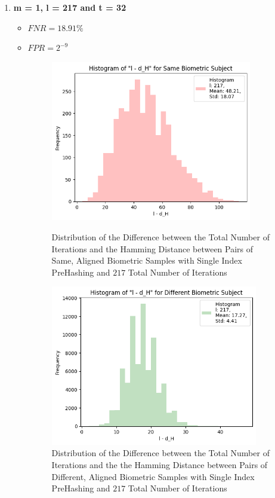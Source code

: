 \begin{enumerate}
    \item \textbf{m = 1, l = 217 and t = 32}
        \begin{itemize}
            \item $FNR = 18.91\%$
            \item $FPR = 2^{-9}$

            \begin{figure}[H]
                \centering
                \begin{minipage}[b]{0.48\linewidth}
                    \centering
                    \includegraphics[width=\linewidth,height=7cm,keepaspectratio]{latex-img/l-dHconfig1a_same.png}
                    \caption{Distribution of the Difference between the Total Number of Iterations and the Hamming Distance between Pairs of Same, Aligned Biometric Samples with Single Index PreHashing and $217$ Total Number of Iterations}
                    \label{l-dHconfig1a_same}
                \end{minipage}
                \hfill
                \begin{minipage}[b]{0.48\linewidth}
                    \centering
                    \includegraphics[width=\linewidth,height=7cm,keepaspectratio]{latex-img/l-dHconfig1a_diff.png}
                    \caption{Distribution of the Difference between the Total Number of Iterations and the the Hamming Distance between Pairs of Different, Aligned Biometric Samples with Single Index PreHashing and $217$ Total Number of Iterations}
                    \label{l-dHconfig1a_diff}
                \end{minipage}
            \end{figure}
            

\end{itemize}
\end{enumerate}
